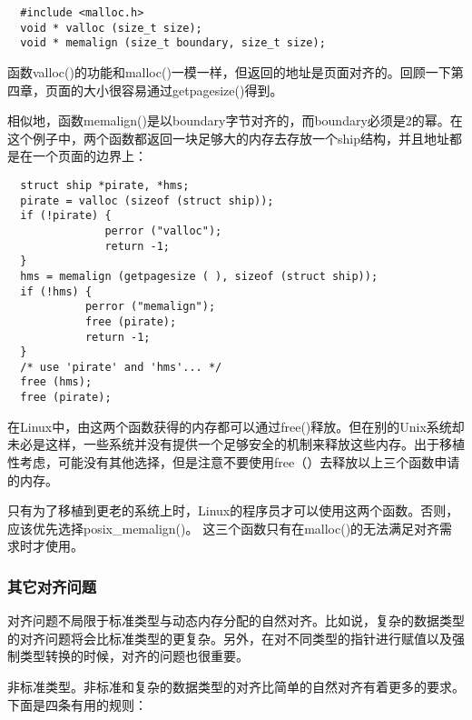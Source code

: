 \begin{lstlisting}
  #include <malloc.h>
  void * valloc (size_t size);
  void * memalign (size_t boundary, size_t size);
\end{lstlisting}

函数valloc()的功能和malloc()一模一样，但返回的地址是页面对齐的。回顾一下第四章，页面的大小很容易通过getpagesize()得到。

相似地，函数memalign()是以boundary字节对齐的，而boundary必须是2的幂。在这个例子中，两个函数都返回一块足够大的内存去存放一个ship结构，并且地址都是在一个页面的边界上： 

\begin{lstlisting}
  struct ship *pirate, *hms;
  pirate = valloc (sizeof (struct ship));
  if (!pirate) {
               perror ("valloc");
               return -1;
  }
  hms = memalign (getpagesize ( ), sizeof (struct ship));
  if (!hms) {
            perror ("memalign");
            free (pirate);
            return -1;
  }
  /* use 'pirate' and 'hms'... */
  free (hms);
  free (pirate);
\end{lstlisting}

在Linux中，由这两个函数获得的内存都可以通过free()释放。但在别的Unix系统却未必是这样，一些系统并没有提供一个足够安全的机制来释放这些内存。出于移植性考虑，可能没有其他选择，但是注意不要使用free（）去释放以上三个函数申请的内存。

只有为了移植到更老的系统上时，Linux的程序员才可以使用这两个函数。否则，应该优先选择posix\_memalign()。 这三个函数只有在malloc()的无法满足对齐需求时才使用。 

\subsubsection{其它对齐问题}

对齐问题不局限于标准类型与动态内存分配的自然对齐。比如说，复杂的数据类型的对齐问题将会比标准类型的更复杂。另外，在对不同类型的指针进行赋值以及强制类型转换的时候，对齐的问题也很重要。 

  非标准类型。非标准和复杂的数据类型的对齐比简单的自然对齐有着更多的要求。下面是四条有用的规则： 

